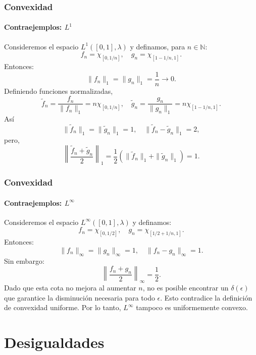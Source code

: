 \documentclass[aspectratio=169]{beamer}
\begin{document}
\begin{frame}
  \frametitle{Convexidad}
  \framesubtitle{Contraejemplos: $ L^1 $}
  Consideremos el espacio \(L^1([0,1], \lambda)\) y definamos, para \(n \in \mathbb{N}\):
  \begin{equation}
      f_n = \chi_{[0,1/n]}, \quad g_n = \chi_{[1-1/n,1]}.
  \end{equation}
  Entonces:
  \begin{equation}
      \|f_n\|_1 = \|g_n\|_1 = \frac{1}{n} \to 0.
  \end{equation}
  Definiendo funciones normalizadas,
  \begin{equation}
      \tilde{f}_n = \frac{f_n}{\|f_n\|_1} = n \chi_{[0,1/n]}, \quad \tilde{g}_n = \frac{g_n}{\|g_n\|_1} = n \chi_{[1-1/n,1]}.
  \end{equation}
  Así
  \begin{equation}
      \|\tilde{f}_n\|_1 = \|\tilde{g}_n\|_1 = 1, \quad \|\tilde{f}_n - \tilde{g}_n\|_1 = 2,
  \end{equation}
  pero,
  \begin{equation}
      \left\|\frac{\tilde{f}_n + \tilde{g}_n}{2}\right\|_1 = \frac{1}{2}(\|\tilde{f}_n\|_1 + \|\tilde{g}_n\|_1) = 1.
  \end{equation}
\end{frame}

\begin{frame}
  \frametitle{Convexidad}
  \framesubtitle{Contraejemplos: $ L^\infty $}
  Consideremos el espacio \(L^\infty([0,1], \lambda)\) y definamos:
    \begin{equation}
        f_n = \chi_{[0,1/2]}, \quad g_n = \chi_{[1/2 + 1/n,1]}.
    \end{equation}
    Entonces:
    \begin{equation}
        \|f_n\|_\infty = \|g_n\|_\infty = 1, \quad \|f_n - g_n\|_\infty = 1.
    \end{equation}
    Sin embargo:
    \begin{equation}
        \left\|\frac{f_n + g_n}{2}\right\|_\infty = \frac{1}{2}.
    \end{equation}
  Dado que esta cota no mejora al aumentar \(n\), no es posible encontrar un \(\delta(\epsilon)\) que garantice la disminución necesaria para todo \(\epsilon\). Esto contradice la definición de convexidad uniforme.  
  Por lo tanto, \(L^\infty\) tampoco es uniformemente convexo.  
\end{frame}

\section{Desigualdades}
\end{document}
